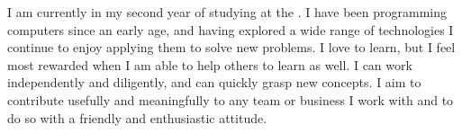 
I am currently in my second year of studying \courseshort{} at the \university{}. I have been programming computers since an early age, and having explored a wide range of technologies I continue to enjoy applying them to solve new problems. I love to learn, but I feel most rewarded when I am able to help others to learn as well. I can work independently and diligently, and can quickly grasp new concepts. I aim to contribute usefully and meaningfully to any team or business I work with and to do so with a friendly and enthusiastic attitude.
